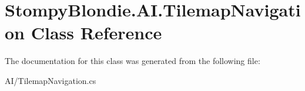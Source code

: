 \hypertarget{class_stompy_blondie_1_1_a_i_1_1_tilemap_navigation}{}\section{Stompy\+Blondie.\+A\+I.\+Tilemap\+Navigation Class Reference}
\label{class_stompy_blondie_1_1_a_i_1_1_tilemap_navigation}


The documentation for this class was generated from the following file\+:\begin{DoxyCompactItemize}
\item 
A\+I/Tilemap\+Navigation.\+cs\end{DoxyCompactItemize}
